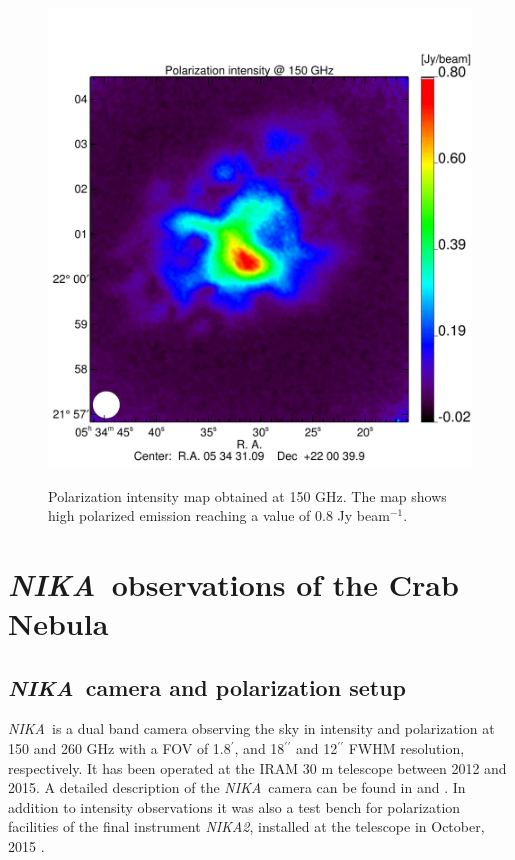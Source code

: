 \documentclass[twocolumn,traditabstract]{aa}
\def\NIKA{\textit{NIKA}}
\def\NIKAd{\textit{NIKA2}}
\begin{document}
 \begin{figure}
  \centering
     	   {\includegraphics[width=0.75\linewidth,keepaspectratio]{figures/Crab_ipol2_2mm.pdf}}
\caption{Polarization intensity map obtained at 150 GHz. The map shows high polarized emission reaching a value of 0.8 Jy beam$^{-1}$.}
\label{crab_ipol_maps}		
  \end{figure}
 

\section{\NIKA\ observations of the Crab Nebula}\label{sec:NIKA observations}
\subsection{\NIKA\ camera and polarization setup}\label{sec:nika camera}
\NIKA\ is a dual band camera observing the sky in intensity and polarization at 150 and 260 GHz with a FOV of 1.8$^{\prime}$, and 18$^{\prime\prime}$ and 12$^{\prime\prime}$ FWHM resolution, respectively. It has been operated at the IRAM 30 m telescope between 2012 and 2015. A detailed description of the \NIKA\ camera can be found in \citet{monfardini2010, monfardini2011} and \citet{catalano2014}. In addition to intensity observations it was also a test bench for polarization facilities of the final instrument \NIKAd, installed at the telescope in October, 2015 \citep{calvo2016,2016arXiv160508628C}.
\end{document}
